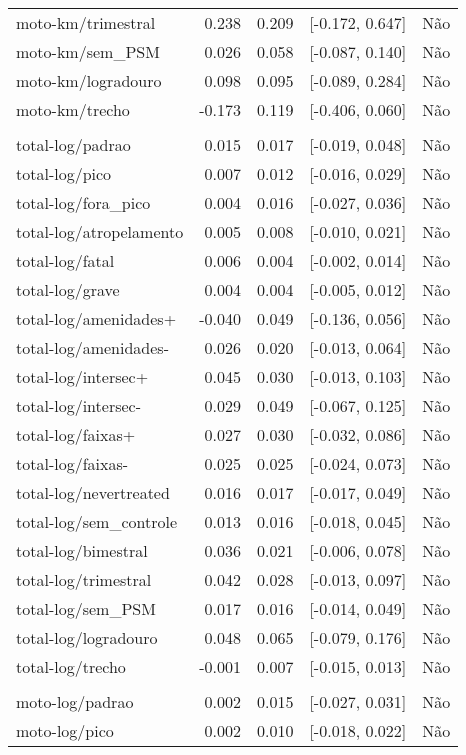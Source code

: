 \begin{longtable}{lrrcl}
moto-km/trimestral & 0.238 & 0.209 & {}[-0.172, 0.647] & Não\\
moto-km/sem\_PSM & 0.026 & 0.058 & {}[-0.087, 0.140] & Não\\
moto-km/logradouro & 0.098 & 0.095 & {}[-0.089, 0.284] & Não\\
moto-km/trecho & -0.173 & 0.119 & {}[-0.406, 0.060] & Não\\
 &  &  &  & \\
total-log/padrao & 0.015 & 0.017 & {}[-0.019, 0.048] & Não\\
total-log/pico & 0.007 & 0.012 & {}[-0.016, 0.029] & Não\\
total-log/fora\_pico & 0.004 & 0.016 & {}[-0.027, 0.036] & Não\\
total-log/atropelamento & 0.005 & 0.008 & {}[-0.010, 0.021] & Não\\
total-log/fatal & 0.006 & 0.004 & {}[-0.002, 0.014] & Não\\
total-log/grave & 0.004 & 0.004 & {}[-0.005, 0.012] & Não\\
total-log/amenidades+ & -0.040 & 0.049 & {}[-0.136, 0.056] & Não\\
total-log/amenidades- & 0.026 & 0.020 & {}[-0.013, 0.064] & Não\\
total-log/intersec+ & 0.045 & 0.030 & {}[-0.013, 0.103] & Não\\
total-log/intersec- & 0.029 & 0.049 & {}[-0.067, 0.125] & Não\\
total-log/faixas+ & 0.027 & 0.030 & {}[-0.032, 0.086] & Não\\
total-log/faixas- & 0.025 & 0.025 & {}[-0.024, 0.073] & Não\\
total-log/nevertreated & 0.016 & 0.017 & {}[-0.017, 0.049] & Não\\
total-log/sem\_controle & 0.013 & 0.016 & {}[-0.018, 0.045] & Não\\
total-log/bimestral & 0.036 & 0.021 & {}[-0.006, 0.078] & Não\\
total-log/trimestral & 0.042 & 0.028 & {}[-0.013, 0.097] & Não\\
total-log/sem\_PSM & 0.017 & 0.016 & {}[-0.014, 0.049] & Não\\
total-log/logradouro & 0.048 & 0.065 & {}[-0.079, 0.176] & Não\\
total-log/trecho & -0.001 & 0.007 & {}[-0.015, 0.013] & Não\\
 &  &  &  & \\
moto-log/padrao & 0.002 & 0.015 & {}[-0.027, 0.031] & Não\\
moto-log/pico & 0.002 & 0.010 & {}[-0.018, 0.022] & Não\\

\end{longtable}
